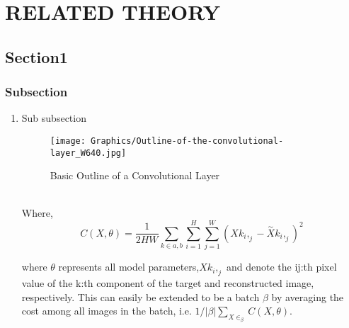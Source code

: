 \chapter{RELATED THEORY}
\section{Section1}
        \subsection{Subsection}
        \begin{enumerate}[label=\alph*.]
            \item Sub subsection
        
          \begin{figure}[ht]
            \centering
            \texttt{[image: Graphics/Outline-of-the-convolutional-layer\_W640.jpg]}\\
            \caption{Basic Outline of a Convolutional Layer}
        \end{figure}\\
        
Where,
        \begin{equation}
            C(X, \theta)=\frac{1}{2HW}\sum_{k\in{a,b}}\sum_{i=1}^{H} \sum_{j=1}^{W} (Xk_i,_j - \overset{\sim}{X}k_i,_j)^2
             \end{equation}
         
        where $\theta$ represents all model parameters,$Xk_i,_j$ and denote the ij:th pixel value of the k:th component of the target and reconstructed image, respectively. This can easily be extended to be a batch $\beta$ by averaging the cost among all images in the batch, i.e. $1/|\beta|\sum_{X\in_{\beta}} C(X,\theta)$.\\
        \end{enumerate}